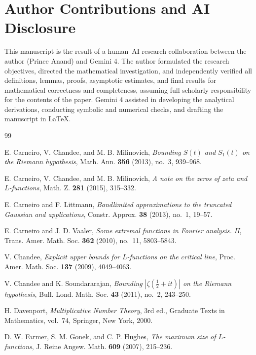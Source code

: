 \documentclass[11pt,a4paper]{amsart}
\theoremstyle{remark}
\numberwithin{equation}{section}
\begin{document}
\section*{Author Contributions and AI Disclosure}
This manuscript is the result of a human--AI research collaboration between the author (Prince Anand) and Gemini 4. The author formulated the research objectives, directed the mathematical investigation, and independently verified all definitions, lemmas, proofs, asymptotic estimates, and final results for mathematical correctness and completeness, assuming full scholarly responsibility for the contents of the paper. Gemini 4 assisted in developing the analytical derivations, conducting symbolic and numerical checks, and drafting the manuscript in \LaTeX.

\begin{thebibliography}{99}

E. Carneiro, V. Chandee, and M. B. Milinovich, \emph{Bounding $S(t)$ and $S_1(t)$ on the Riemann hypothesis}, Math. Ann. \textbf{356} (2013), no.~3, 939--968.

E. Carneiro, V. Chandee, and M. B. Milinovich, \emph{A note on the zeros of zeta and $L$-functions}, Math. Z. \textbf{281} (2015), 315--332.

E. Carneiro and F. Littmann, \emph{Bandlimited approximations to the truncated Gaussian and applications}, Constr. Approx. \textbf{38} (2013), no.~1, 19--57.

E. Carneiro and J. D. Vaaler, \emph{Some extremal functions in Fourier analysis. II}, Trans. Amer. Math. Soc. \textbf{362} (2010), no.~11, 5803--5843.

V. Chandee, \emph{Explicit upper bounds for $L$-functions on the critical line}, Proc. Amer. Math. Soc. \textbf{137} (2009), 4049--4063.

V. Chandee and K. Soundararajan, \emph{Bounding $|\zeta(\frac{1}{2}+it)|$ on the Riemann hypothesis}, Bull. Lond. Math. Soc. \textbf{43} (2011), no.~2, 243--250.

H. Davenport, \emph{Multiplicative Number Theory}, 3rd ed., Graduate Texts in Mathematics, vol.~74, Springer, New York, 2000.

D. W. Farmer, S. M. Gonek, and C. P. Hughes, \emph{The maximum size of $L$-functions}, J. Reine Angew. Math. \textbf{609} (2007), 215--236.


\end{thebibliography}
\end{document}
